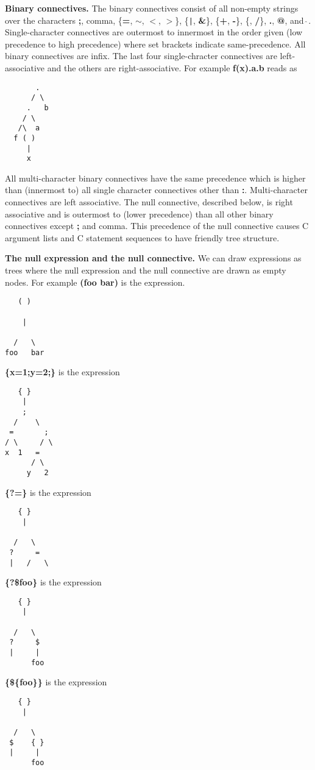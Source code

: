 \documentclass{article}
\newcommand{\mtt}[1]{\mbox{\tt #1}}
\begin{document}
{\bf Binary connectives.} The binary connectives consist of all non-empty strings over the characters {\bf ;}, comma, \{{\bf =}, {\bf $\sim$}, {\bf $<$}, {\bf $>$}\}, \{\mtt{|}, {\bf \&}\}, \{{\bf +},
{\bf -}\}, \{{\bf *}, {\bf /}\}, {\bf .}, {\bf @}, and \mtt{$\hat{~}$}.
Single-character connectives are outermost to innermost in the order given (low
precedence to high precedence) where set brackets indicate same-precedence.    All binary connectives are infix.  The last four single-chracter connectives are left-associative and the
others are right-associative. For example {\bf f(x).a.b} reads as
\begin{verbatim}
       .   
      / \
     .   b
    / \
   /\  a
  f ( )
     |
     x
\end{verbatim}
All multi-character binary connectives have the same
precedence which is higher than (innermost to) all single character connectives other than {\bf :}.
Multi-character connectives are left associative.  The null connective, described below, is right associative and is outermost to (lower precedence) than all other binary connectives
except {\bf;} and comma.  This precedence of the null connective causes C argument lists and C statement sequences to have friendly tree structure.

{\bf The null expression and the null connective.}  We can draw expressions as trees where the null expression and the null connective are drawn as empty nodes.
For example {\bf (foo bar)} is the expression.
\begin{verbatim}
   ( )

    |
      
  /   \
foo   bar
\end{verbatim}
  
{\bf \{x=1;y=2;\}} is the expression
\begin{verbatim}
   { }
    |
    ;   
  /    \
 =       ;
/ \     / \
x  1   =
      / \
     y   2
\end{verbatim}
{\bf \{?=\}} is  the expression
\begin{verbatim}
   { }
    |

  /   \
 ?     =
 |   /   \
\end{verbatim}

{\bf \{?\$foo\}} is  the expression
\begin{verbatim}
   { }
    |

  /   \
 ?     $
 |     |
      foo
\end{verbatim}

{\bf \{\$\{foo\}\}} is  the expression
\begin{verbatim}
   { }
    |

  /   \
 $    { }
 |     |
      foo
\end{verbatim}
\end{document}
